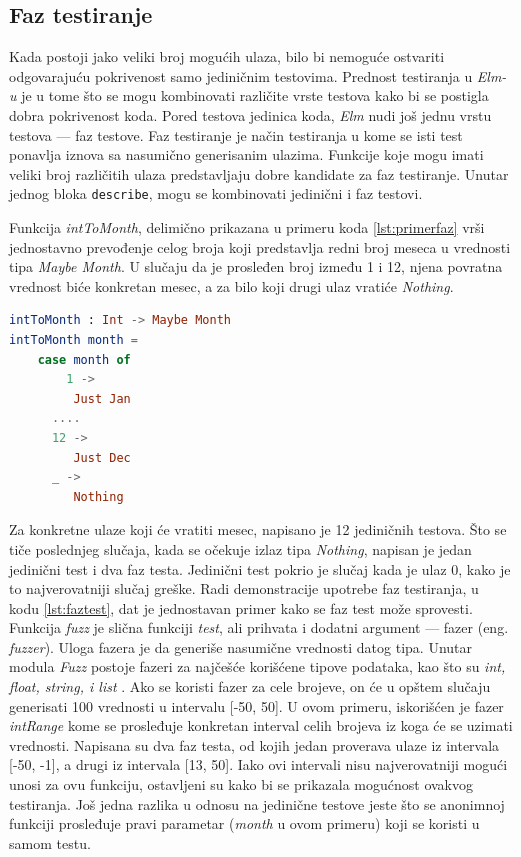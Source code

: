\documentclass[12pt,oneside]{memoir}
\begin{document}
\subsection{Faz testiranje}
\par Kada postoji jako veliki broj mogućih ulaza, bilo bi nemoguće ostvariti odgovarajuću pokrivenost samo jediničnim testovima. Prednost testiranja u \emph{Elm-u} je u tome što se mogu kombinovati različite vrste testova kako bi se postigla dobra pokrivenost koda. Pored testova jedinica koda, \emph{Elm} nudi još jednu vrstu testova --- faz testove. Faz testiranje je način testiranja u kome se isti test ponavlja iznova sa nasumično generisanim ulazima. Funkcije koje mogu imati veliki broj različitih ulaza predstavljaju dobre kandidate za faz testiranje. Unutar jednog bloka \texttt{describe}, mogu se kombinovati jedinični i faz testovi.
\par Funkcija \emph{intToMonth}, delimično prikazana u primeru koda \ref{lst:primerfaz} vrši jednostavno prevođenje celog broja koji predstavlja redni broj meseca u vrednosti tipa \emph{Maybe Month}. U slučaju da je prosleđen broj između 1 i 12, njena povratna vrednost biće konkretan mesec, a za bilo koji drugi ulaz vratiće \emph{Nothing}.

\begin{minipage}{\linewidth}
\begin{lstlisting}[language=elm, basicstyle=\small, caption={Implementacija funkcije \emph{intToMonth}},captionpos=b, label={lst:primerfaz}]
intToMonth : Int -> Maybe Month
intToMonth month =
    case month of
     	1 -> 
         Just Jan
      ....
      12 ->
         Just Dec
      _ ->
         Nothing
\end{lstlisting}
\end{minipage}

\par Za konkretne ulaze koji će vratiti mesec, napisano je 12 jediničnih testova. Što se tiče poslednjeg slučaja, kada se očekuje izlaz tipa \emph{Nothing}, napisan je jedan jedinični test i dva faz testa. Jedinični test pokrio je slučaj kada je ulaz 0, kako je to najverovatniji slučaj greške. Radi demonstracije upotrebe faz testiranja, u kodu \ref{lst:faztest}, dat je jednostavan primer kako se faz test može sprovesti. Funkcija \emph{fuzz} je slična funkciji \emph{test}, ali prihvata i dodatni argument --- fazer (eng. \emph{fuzzer}). Uloga fazera je da generiše nasumične vrednosti datog tipa. Unutar modula \emph{Fuzz} postoje fazeri za najčešće korišćene tipove podataka, kao što su \emph{int, float, string, i list} \cite{fuzz}. Ako se koristi fazer za cele brojeve, on će u opštem slučaju generisati 100 vrednosti u intervalu [-50, 50]. U ovom primeru, iskorišćen je fazer \emph{intRange} kome se prosleđuje konkretan interval celih brojeva iz koga će se uzimati vrednosti. Napisana su dva faz testa, od kojih jedan proverava ulaze iz intervala [-50, -1], a drugi iz intervala [13, 50]. Iako ovi intervali nisu najverovatniji mogući unosi za ovu funkciju, ostavljeni su kako bi se prikazala mogućnost ovakvog testiranja. Još jedna razlika u odnosu na jedinične testove jeste što se anonimnoj funkciji prosleđuje pravi parametar (\emph{month} u ovom primeru) koji se koristi u samom testu. 
\end{document}
